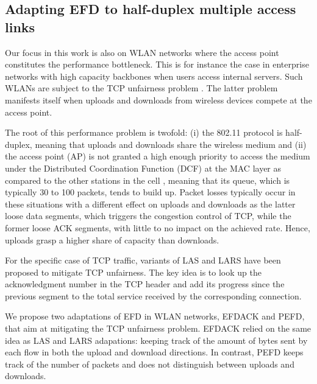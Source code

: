 \documentclass[preprint,12pt]{elsarticle}
\begin{document}
 
\subsection{Adapting EFD to half-duplex multiple access links} \label{subsec:halfdup}

Our focus in this work is also on WLAN networks where the access point constitutes the performance bottleneck. This is for instance the case in enterprise networks with high capacity backbones when users access internal servers. Such WLANs are subject to the TCP unfairness problem \cite{Pilosof03understandingtcp}. The latter problem manifests itself when uploads and downloads from wireless devices compete at the access point. 

%
The root of this performance problem is twofold: (i) the 802.11 protocol is half-duplex, meaning that uploads and downloads share the wireless medium and (ii) the access point (AP) is not granted a high enough priority to access the medium under the Distributed Coordination Function (DCF) at the MAC layer as compared to the other stations in the cell \cite{Pilosof03understandingtcp}, meaning that its queue, which is typically 30 to 100 packets, tends to build up. Packet losses typically occur in these situations with a different effect on uploads and downloads as the latter loose data segments, which triggers the congestion control of TCP, while the former loose ACK segments, with little to no impact on the achieved rate. Hence, uploads grasp a higher share of capacity than downloads.

For the specific case of TCP traffic, variants of LAS and LARS \cite{Keller2008Improving, heusse2011least} have been proposed to mitigate TCP unfairness. The key idea  is to look up the acknowledgment number in the TCP header and add its progress since the previous segment to the  total service received  by the corresponding connection. %
%

We propose two adaptations of EFD in WLAN networks, EFDACK and PEFD,  that aim at mitigating the TCP unfairness problem. EFDACK relied on the same idea as LAS and LARS adapations: keeping  track of the amount of bytes sent by each flow in both the upload and download directions. %
In contrast, PEFD keeps track of the number of packets and does not distinguish between uploads and downloads. 
\end{document}
